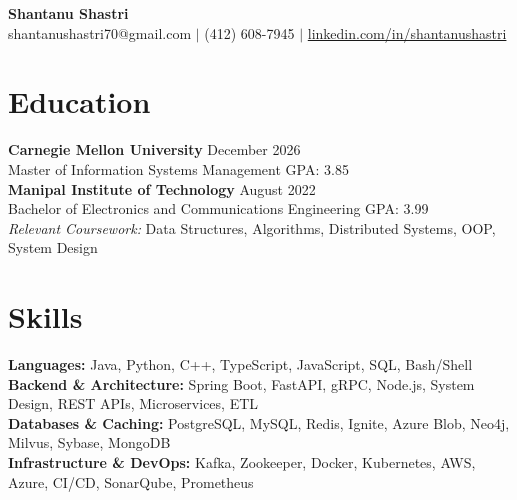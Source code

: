 \documentclass[11pt,a4paper]{article}
\begin{document}
\begin{center}
    \Huge \textbf{Shantanu Shastri} \\
    \vspace{2pt}
    \small shantanushastri70@gmail.com $|$ (412) 608-7945 $|$ \href{https://linkedin.com/in/shantanushastri}{linkedin.com/in/shantanushastri}
\end{center}

\vspace{-5pt}
\section{Education}
\noindent
\textbf{Carnegie Mellon University} \hfill December 2026 \\
Master of Information Systems Management \hfill GPA: 3.85 \\
\textbf{Manipal Institute of Technology} \hfill August 2022 \\
Bachelor of Electronics and Communications Engineering \hfill GPA: 3.99 \\
\textit{Relevant Coursework:} Data Structures, Algorithms, Distributed Systems, OOP, System Design

\vspace{-5pt}
\section{Skills}
\noindent
\textbf{Languages:} Java, Python, C++, TypeScript, JavaScript, SQL, Bash/Shell \\
\textbf{Backend \& Architecture:} Spring Boot, FastAPI, gRPC, Node.js, System Design, REST APIs, Microservices, ETL \\
\textbf{Databases \& Caching:} PostgreSQL, MySQL, Redis, Ignite, Azure Blob, Neo4j, Milvus, Sybase, MongoDB \\
\textbf{Infrastructure \& DevOps:} Kafka, Zookeeper, Docker, Kubernetes, AWS, Azure, CI/CD, SonarQube, Prometheus

\vspace{-5pt}
\end{document}
